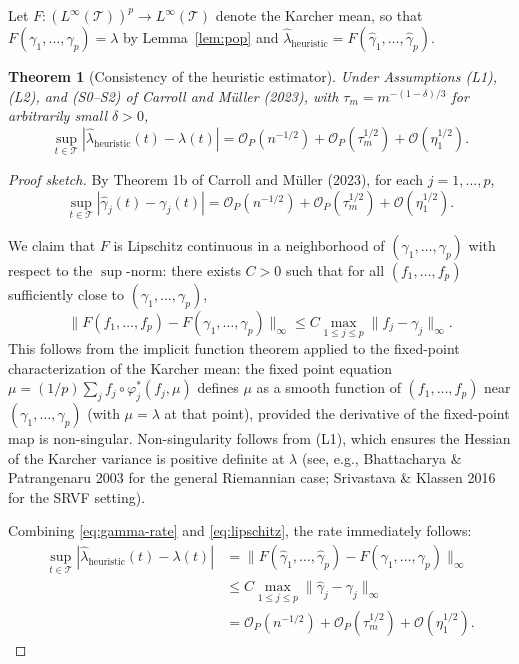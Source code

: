 \documentclass[11pt]{article}
\newtheorem{theorem}{Theorem}
\theoremstyle{definition}
\newcommand{\T}{\mathcal{T}}
\newcommand{\lhat}{\hat{\lambda}}
\newcommand{\ghat}{\hat{\gamma}}
\newcommand{\Op}{\mathcal{O}_P}
\newcommand{\sups}{\sup_{t \in \T}}
\begin{document}
Let $F : (L^\infty(\T))^p \to L^\infty(\T)$ denote the Karcher mean,
so that $F(\gamma_1,\ldots,\gamma_p) = \lambda$ by Lemma~\ref{lem:pop} and
$\lhat_{\mathrm{heuristic}} = F(\ghat_1,\ldots,\ghat_p)$.

\begin{theorem}[Consistency of the heuristic estimator]
  \label{thm:heuristic}
  Under Assumptions (L1), (L2), and (S0--S2) of Carroll and M\"{u}ller (2023),
  with $\tau_m = m^{-(1-\delta)/3}$ for arbitrarily small $\delta > 0$,
  \[
    \sups |\lhat_{\mathrm{heuristic}}(t) - \lambda(t)|
    = \Op(n^{-1/2}) + \Op(\tau_m^{1/2}) + \mathcal{O}(\eta_1^{1/2}).
  \]
\end{theorem}

\begin{proof}[Proof sketch]
By Theorem 1b of Carroll and M\"{u}ller (2023), for each $j = 1,\ldots,p$,
\begin{equation}
  \sups |\ghat_j(t) - \gamma_j(t)|
  = \Op(n^{-1/2}) + \Op(\tau_m^{1/2}) + \mathcal{O}(\eta_1^{1/2}).
  \label{eq:gamma-rate}
\end{equation}


We claim that $F$ is Lipschitz continuous in a neighborhood of
$(\gamma_1,\ldots,\gamma_p)$ with respect to the $\sup$-norm:
there exists $C > 0$ such that for all $(f_1,\ldots,f_p)$ sufficiently close to
$(\gamma_1,\ldots,\gamma_p)$,
\begin{equation}
  \|F(f_1,\ldots,f_p) - F(\gamma_1,\ldots,\gamma_p)\|_\infty
  \leq C \max_{1 \leq j \leq p} \|f_j - \gamma_j\|_\infty.
  \label{eq:lipschitz}
\end{equation}
This follows from the implicit function theorem applied to the fixed-point
characterization of the Karcher mean: the fixed point equation
$\mu = (1/p)\sum_j f_j \circ \varphi_j^*(f_j, \mu)$
defines $\mu$ as a smooth function of $(f_1,\ldots,f_p)$ near
$(\gamma_1,\ldots,\gamma_p)$ (with $\mu = \lambda$ at that point), provided the derivative of the
fixed-point map is non-singular. Non-singularity follows from (L1), which
ensures the Hessian of the Karcher variance is positive definite at $\lambda$
(see, e.g., Bhattacharya \& Patrangenaru 2003 for the general Riemannian case;
Srivastava \& Klassen 2016 for the SRVF setting).

Combining \eqref{eq:gamma-rate} and \eqref{eq:lipschitz}, the rate immediately follows:
\begin{align*}
  \sups |\lhat_{\mathrm{heuristic}}(t) - \lambda(t)|
  &= \|F(\ghat_1,\ldots,\ghat_p) - F(\gamma_1,\ldots,\gamma_p)\|_\infty \\
  &\leq C \max_{1 \leq j \leq p} \|\ghat_j - \gamma_j\|_\infty \\
  &= \Op(n^{-1/2}) + \Op(\tau_m^{1/2}) + \mathcal{O}(\eta_1^{1/2}).
\end{align*}
\end{proof}
\end{document}
